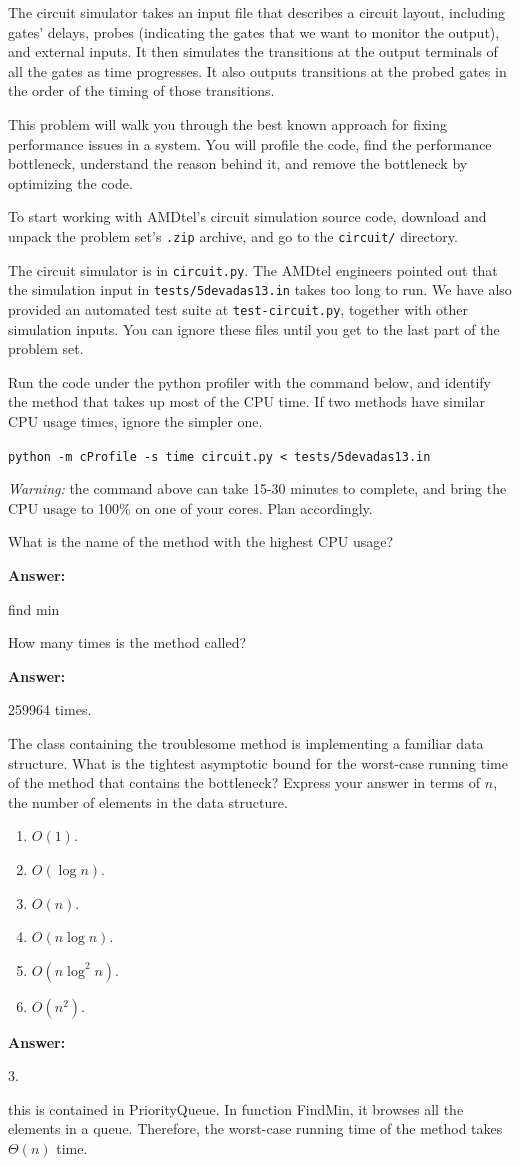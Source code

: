 \documentclass[12pt,twoside]{article}
\newcommand{\answer}{
 \par\medskip
 \textbf{Answer:}
}
\newcommand{\answerIIa}{ \answer 
{\color{blue}  find min}
}
\newcommand{\answerIIb}{ \answer
{\color{blue}259964 times.}
}
\newcommand{\answerIIc}{ \answer
{\color{blue}3.

this is contained in PriorityQueue. In function FindMin, it browses all the elements in 
a queue. Therefore, the worst-case running time of the method takes $\Theta(n)$ time. 
}
}
\begin{document}
\begin{problems}
The circuit simulator takes an input file that describes a circuit layout,
including gates' delays, probes (indicating the gates that we want to
monitor the output), and external inputs. It then simulates the transitions at
the output terminals of all the gates as time progresses. It also outputs
transitions at the probed gates in the order of the timing of those
transitions.

This problem will walk you through the best known approach for fixing
performance issues in a system. You will profile the code, find the performance
bottleneck, understand the reason behind it, and remove the bottleneck by
optimizing the code.

To start working with AMDtel's circuit simulation source code, download and
unpack the problem set's \texttt{.zip} archive, and go to the \texttt{circuit/}
directory.

The circuit simulator is in \texttt{circuit.py}. The AMDtel engineers pointed
out that the simulation input in \texttt{tests/5devadas13.in} takes too long
to run. We have also provided an automated test suite at
\texttt{test-circuit.py}, together with other simulation inputs. You can ignore
these files until you get to the last part of the problem set.

\begin{problemparts}

\problempart {} Run the code under the python profiler with the command
below, and identify the method that takes up most of the CPU time. If two
methods have similar CPU usage times, ignore the simpler one.

\texttt{python -m cProfile -s time circuit.py < tests/5devadas13.in}

\textit{Warning:} the command above can take 15-30 minutes to complete, and
bring the CPU usage to 100\% on one of your cores. Plan accordingly.

What is the name of the method with the highest CPU usage?
\answerIIa


\problempart {} How many times is the method called?
\answerIIb

\problempart {} The class containing the troublesome method is
implementing a familiar data structure. What is the tightest asymptotic bound
for the worst-case running time of the method that contains the bottleneck?
Express your answer in terms of $n$, the number of elements in the data
structure.
\begin{enumerate}
  \item $O(1)$.
  \item $O(\log n)$.
  \item $O(n)$.
  \item $O(n \log n)$.
  \item $O(n \log^2 n)$.
  \item $O(n^2)$.
\end{enumerate}
\answerIIc 


\end{problemparts}
\end{problems}
\end{document}
